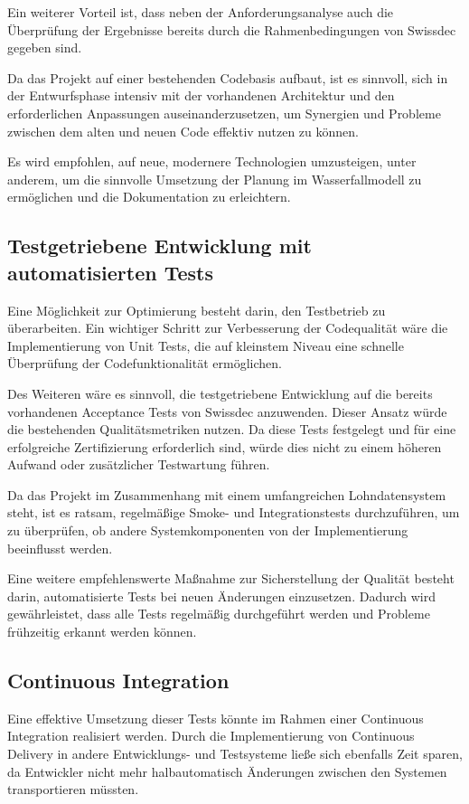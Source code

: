 Ein weiterer Vorteil ist, dass neben der Anforderungsanalyse auch die Überprüfung der Ergebnisse bereits durch die Rahmenbedingungen von Swissdec gegeben sind.

Da das Projekt auf einer bestehenden Codebasis aufbaut, ist es sinnvoll, sich in der Entwurfsphase intensiv mit der vorhandenen Architektur und den erforderlichen Anpassungen auseinanderzusetzen, um Synergien und Probleme zwischen dem alten und neuen Code effektiv nutzen zu können.

Es wird empfohlen, auf neue, modernere Technologien umzusteigen, unter anderem, um die sinnvolle Umsetzung der Planung im Wasserfallmodell zu ermöglichen und die Dokumentation zu erleichtern.


\subsection{Testgetriebene Entwicklung mit automatisierten Tests}

Eine Möglichkeit zur Optimierung besteht darin, den Testbetrieb zu überarbeiten. Ein wichtiger Schritt zur Verbesserung der Codequalität wäre die Implementierung von Unit Tests, die auf kleinstem Niveau eine schnelle Überprüfung der Codefunktionalität ermöglichen.

Des Weiteren wäre es sinnvoll, die testgetriebene Entwicklung auf die bereits vorhandenen Acceptance Tests von Swissdec anzuwenden. Dieser Ansatz würde die bestehenden Qualitätsmetriken nutzen. Da diese Tests festgelegt und für eine erfolgreiche Zertifizierung erforderlich sind, würde dies nicht zu einem höheren Aufwand oder zusätzlicher Testwartung führen.

Da das Projekt im Zusammenhang mit einem umfangreichen Lohndatensystem steht, ist es ratsam, regelmäßige Smoke- und Integrationstests durchzuführen, um zu überprüfen, ob andere Systemkomponenten von der Implementierung beeinflusst werden.

Eine weitere empfehlenswerte Maßnahme zur Sicherstellung der Qualität besteht darin, automatisierte Tests bei neuen Änderungen einzusetzen. Dadurch wird gewährleistet, dass alle Tests regelmäßig durchgeführt werden und Probleme frühzeitig erkannt werden können.

\subsection{Continuous Integration}

Eine effektive Umsetzung dieser Tests könnte im Rahmen einer Continuous Integration realisiert werden. Durch die Implementierung von Continuous Delivery in andere Entwicklungs- und Testsysteme ließe sich ebenfalls Zeit sparen, da Entwickler nicht mehr halbautomatisch Änderungen zwischen den Systemen transportieren müssten.

